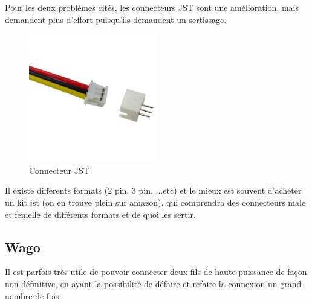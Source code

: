 \documentclass[a4paper, 11pt]{report}
\begin{document}
Pour les deux problèmes cités, les connecteurs JST sont une amélioration,
mais demandent plus d'effort puisqu'ils demandent un sertissage.

\begin{figure}[h]
\caption{Connecteur JST}

\centering{}\includegraphics[width=0.5\textwidth]{images/jst}
\end{figure}

Il existe différents formats (2 pin, 3 pin, ...etc) et le mieux est
souvent d'acheter un kit jst (on en trouve plein sur amazon), qui
comprendra des connecteurs male et femelle de différents formats et
de quoi les sertir.

\subsection{Wago}

Il est parfois très utile de pouvoir connecter deux fils de haute
puissance de façon non définitive, en ayant la possibilité de défaire
et refaire la connexion un grand nombre de fois.
\end{document}

